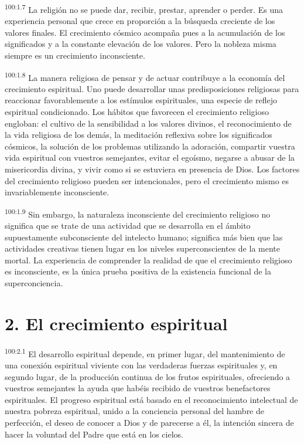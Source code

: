 \documentclass[twoside, 11pt]{book}
\begin{document}
\par
\textsuperscript{100:1.7} La religión no se puede dar, recibir, prestar, aprender o perder. Es una experiencia personal que crece en proporción a la búsqueda creciente de los valores finales. El crecimiento cósmico acompaña pues a la acumulación de los significados y a la constante elevación de los valores. Pero la nobleza misma siempre es un crecimiento inconsciente.

\par
\textsuperscript{100:1.8} La manera religiosa de pensar y de actuar contribuye a la economía del crecimiento espiritual. Uno puede desarrollar unas predisposiciones religiosas para reaccionar favorablemente a los estímulos espirituales, una especie de reflejo espiritual condicionado. Los hábitos que favorecen el crecimiento religioso engloban: el cultivo de la sensibilidad a los valores divinos, el reconocimiento de la vida religiosa de los demás, la meditación reflexiva sobre los significados cósmicos, la solución de los problemas utilizando la adoración, compartir vuestra vida espiritual con vuestros semejantes, evitar el egoísmo, negarse a abusar de la misericordia divina, y vivir como si se estuviera en presencia de Dios. Los factores del crecimiento religioso pueden ser intencionales, pero el crecimiento mismo es invariablemente inconsciente.

\par
\textsuperscript{100:1.9} Sin embargo, la naturaleza inconsciente del crecimiento religioso no significa que se trate de una actividad que se desarrolla en el ámbito supuestamente subconsciente del intelecto humano; significa más bien que las actividades creativas tienen lugar en los niveles superconscientes de la mente mortal. La experiencia de comprender la realidad de que el crecimiento religioso es inconsciente, es la única prueba positiva de la existencia funcional de la superconciencia.

\section*{2. El crecimiento espiritual}
\par
\textsuperscript{100:2.1} El desarrollo espiritual depende, en primer lugar, del mantenimiento de una conexión espiritual viviente con las verdaderas fuerzas espirituales y, en segundo lugar, de la producción continua de los frutos espirituales, ofreciendo a vuestros semejantes la ayuda que habéis recibido de vuestros benefactores espirituales. El progreso espiritual está basado en el reconocimiento intelectual de nuestra pobreza espiritual, unido a la conciencia personal del hambre de perfección, el deseo de conocer a Dios y de parecerse a él, la intención sincera de hacer la voluntad del Padre que está en los cielos.
\end{document}
